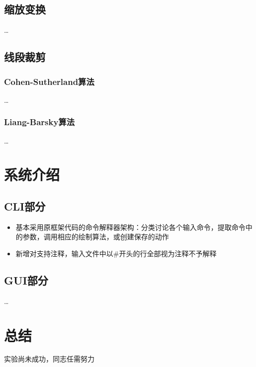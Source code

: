 \documentclass[a4paper,UTF8]{article}
\theoremstyle{definition}
\begin{document}
\subsection{缩放变换}
\dots

\subsection{线段裁剪}
\subsubsection{Cohen-Sutherland算法}
\dots
\subsubsection{Liang-Barsky算法}
\dots
    

\section{系统介绍}
\subsection{CLI部分}
\begin{itemize}
  \item 基本采用原框架代码的命令解释器架构：分类讨论各个输入命令，提取命令中的参数，调用相应的绘制算法，或创建保存的动作
  \item 新增对支持注释，输入文件中以\#开头的行全部视为注释不予解释
\end{itemize}

\subsection{GUI部分}
\dots

\section{总结}
实验尚未成功，同志任需努力

%

\end{document}
